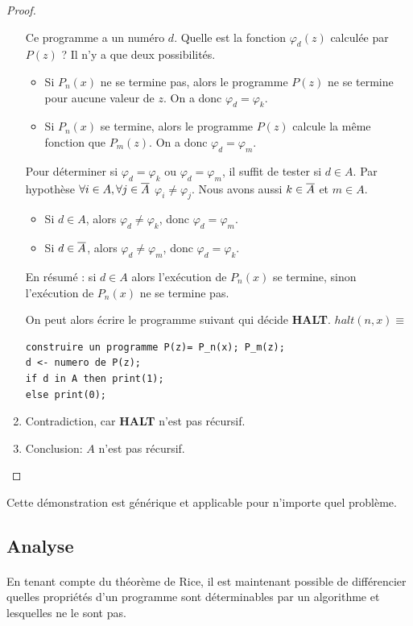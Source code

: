 \begin{proof}
\begin{enumerate}
			Ce programme a un numéro $d$.  Quelle est la fonction $\varphi_d(z)$ calculée par $P(z)$ ? Il n'y a que deux possibilités.
			\begin{itemize}
				\item Si $P_n(x)$ ne se termine pas, alors le programme $P(z)$ ne se termine pour aucune valeur de $z$. On a donc $\varphi_d =\varphi_k$.
				\item Si $P_n(x)$ se termine, alors le programme $P(z)$ calcule la même fonction que $P_m(z)$. On a donc $\varphi_d =\varphi_m$.
			\end{itemize}

Pour déterminer si $\varphi_d =\varphi_k$ ou  $\varphi_d =\varphi_m$, il suffit de tester si $d \in A$.   Par hypothèse  $\forall i \in A, \forall j \in \overline{A}$ $\varphi_i \neq \varphi_j$.  Nous avons aussi $k\in \overline{A}$ et $m\in A$.
			\begin{itemize}
            \item Si $d \in A$, alors  $\varphi_d \neq \varphi_k$, donc $\varphi_d =\varphi_m$.
            \item Si $d \in \overline{A}$, alors  $\varphi_d \neq \varphi_m$, donc $\varphi_d =\varphi_k$.
			\end{itemize}
En résumé : si $d \in A$ alors l'exécution de $P_n(x)$ se termine, sinon l'exécution de $P_n(x)$ ne se termine pas.

		On peut alors écrire le programme suivant qui décide \textbf{HALT}.
		 $halt(n,x) \equiv $
		\begin{lstlisting}
construire un programme P(z)= P_n(x); P_m(z);
d <- numero de P(z);
if d in A then print(1);
else print(0);
		\end{lstlisting}


	\item Contradiction, car \textbf{HALT} n'est pas récursif.
	\item Conclusion: $A$ n'est pas récursif.
\end{enumerate}

\end{proof}
Cette démonstration est générique et applicable pour n'importe quel problème.
\subsection{Analyse}

\paragraph{} En tenant compte du théorème de Rice, il est maintenant possible de différencier quelles propriétés d'un programme sont déterminables par un algorithme et lesquelles ne le sont pas.

